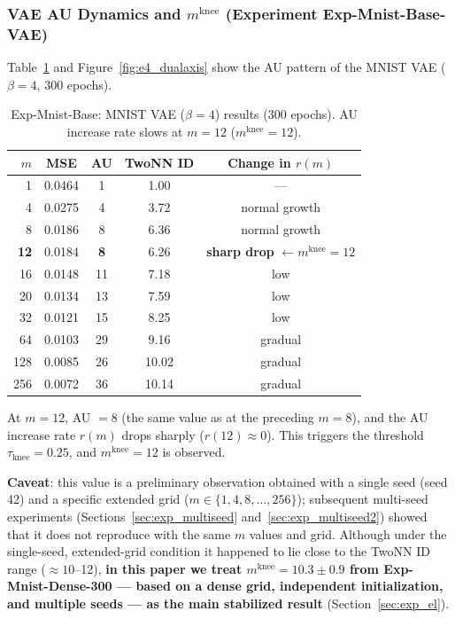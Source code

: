 \documentclass[make,article,submit,pdftex,moreauthors]{Definitions/mdpi}
\newcommand{\mknee}{m^{\mathrm{knee}}}
\begin{document}
\subsubsection{VAE AU Dynamics and $\mknee$ (Experiment Exp-Mnist-Base-VAE)}

Table~\ref{tab:e4_vae} and Figure~\ref{fig:e4_dualaxis} show the AU pattern of the MNIST VAE
($\beta = 4$, 300 epochs).

\begin{table}[H]
\centering
\caption{Exp-Mnist-Base: MNIST VAE ($\beta=4$) results (300 epochs). AU increase rate slows at $m=12$ ($\mknee=12$).}
\label{tab:e4_vae}
\small
\begin{tabular}{rcccc}
\toprule
$m$ & MSE & AU & TwoNN ID & Change in $r(m)$ \\
\midrule
1   & 0.0464 & 1  & 1.00 & --- \\
4   & 0.0275 & 4  & 3.72 & normal growth \\
8   & 0.0186 & 8  & 6.36 & normal growth \\
\textbf{12} & 0.0184 & \textbf{8}  & 6.26 & \textbf{sharp drop} $\leftarrow \mknee = 12$ \\
16  & 0.0148 & 11 & 7.18 & low \\
20  & 0.0134 & 13 & 7.59 & low \\
32  & 0.0121 & 15 & 8.25 & low \\
64  & 0.0103 & 29 & 9.16 & gradual \\
128 & 0.0085 & 26 & 10.02 & gradual \\
256 & 0.0072 & 36 & 10.14 & gradual \\
\bottomrule
\end{tabular}
\end{table}

At $m = 12$, AU $= 8$ (the same value as at the preceding $m = 8$), and the AU increase rate
$r(m)$ drops sharply ($r(12) \approx 0$).
This triggers the threshold $\tau_{\mathrm{knee}} = 0.25$, and $\mknee = 12$ is observed.

\textbf{Caveat}: this value is a preliminary observation obtained with a single seed (seed 42)
and a specific extended grid ($m \in \{1,4,8,\ldots,256\}$); subsequent multi-seed experiments
(Sections~\ref{sec:exp_multiseed} and~\ref{sec:exp_multiseed2}) showed that it does not
reproduce with the same $m$ values and grid.
Although under the single-seed, extended-grid condition it happened to lie close to the TwoNN ID
range ($\approx 10$--12),
\textbf{in this paper we treat $\mknee = 10.3 \pm 0.9$ from Exp-Mnist-Dense-300 --- based on a
dense grid, independent initialization, and multiple seeds --- as the main stabilized result}
(Section~\ref{sec:exp_el}).
\end{document}
